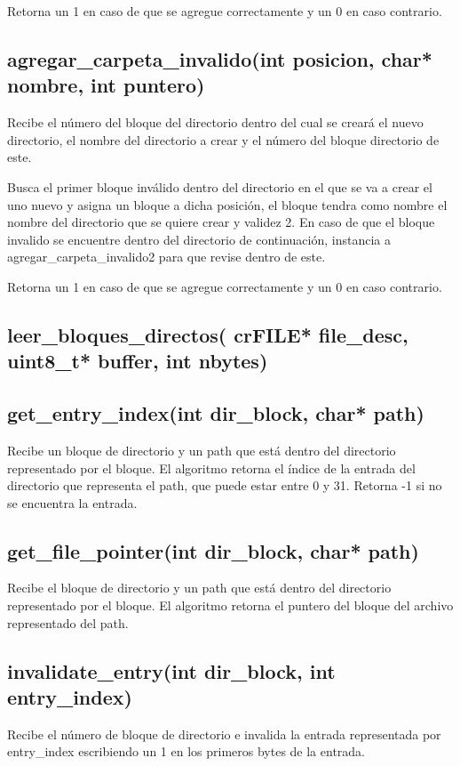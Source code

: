 \documentclass[12pt]{article}
\begin{document}
Retorna un 1 en caso de que se agregue correctamente y un 0 en caso contrario.


\subsection{agregar\_carpeta\_invalido(int posicion, char* nombre, int puntero)}
Recibe el número del bloque del directorio dentro del cual se creará el nuevo directorio, el nombre del directorio a crear y el número del bloque directorio de este.

Busca el primer bloque inválido dentro del directorio en el que se va a crear el uno nuevo y asigna un bloque a dicha posición, el bloque tendra como nombre el nombre del directorio que se quiere crear y validez 2. En caso de que el bloque invalido se encuentre dentro del directorio de continuación, instancia a agregar\_carpeta\_invalido2 para que revise dentro de este.

Retorna un 1 en caso de que se agregue correctamente y un 0 en caso contrario.

\subsection{leer\_bloques\_directos( crFILE* file\_desc, uint8\_t* buffer, int nbytes)}

\subsection{get\_entry\_index(int dir\_block, char* path)}
Recibe un bloque de directorio y un path que está dentro del directorio representado por el bloque. El algoritmo retorna el índice de la entrada del directorio que representa el path, que puede estar entre 0 y 31. Retorna -1 si no se encuentra la entrada.

\subsection{get\_file\_pointer(int dir\_block, char* path)}
Recibe el bloque de directorio y un path que está dentro del directorio representado por el bloque. El algoritmo retorna el puntero del bloque del archivo representado del path.

\subsection{invalidate\_entry(int dir\_block, int entry\_index)}
Recibe el número de bloque de directorio e invalida la entrada representada por entry\_index escribiendo un 1 en los primeros bytes de la entrada.
\end{document}
